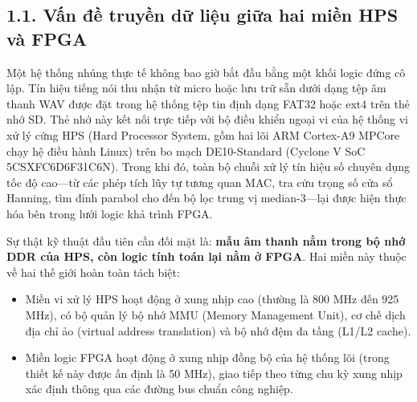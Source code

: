 \subsection*{1.1. Vấn đề truyền dữ liệu giữa hai miền HPS và FPGA}

Một hệ thống nhúng thực tế không bao giờ bắt đầu bằng một khối logic đứng cô lập. Tín hiệu tiếng nói thu nhận từ micro hoặc lưu trữ sẵn dưới dạng tệp âm thanh WAV được đặt trong hệ thống tệp tin định dạng FAT32 hoặc ext4 trên thẻ nhớ SD. Thẻ nhớ này kết nối trực tiếp với bộ điều khiển ngoại vi của hệ thống vi xử lý cứng HPS (Hard Processor System, gồm hai lõi ARM Cortex-A9 MPCore chạy hệ điều hành Linux) trên bo mạch DE10-Standard (Cyclone V SoC 5CSXFC6D6F31C6N). Trong khi đó, toàn bộ chuỗi xử lý tín hiệu số chuyên dụng tốc độ cao---từ các phép tích lũy tự tương quan MAC, tra cứu trọng số cửa sổ Hanning, tìm đỉnh parabol cho đến bộ lọc trung vị median-3---lại được hiện thực hóa bên trong lưới logic khả trình FPGA.

Sự thật kỹ thuật đầu tiên cần đối mặt là: \textbf{mẫu âm thanh nằm trong bộ nhớ DDR của HPS, còn logic tính toán lại nằm ở FPGA}. Hai miền này thuộc về hai thế giới hoàn toàn tách biệt:
\begin{itemize}[leftmargin=1.5em, itemsep=2pt]
    \item Miền vi xử lý HPS hoạt động ở xung nhịp cao (thường là 800 MHz đến 925 MHz), có bộ quản lý bộ nhớ MMU (Memory Management Unit), cơ chế dịch địa chỉ ảo (virtual address translation) và bộ nhớ đệm đa tầng (L1/L2 cache).
    \item Miền logic FPGA hoạt động ở xung nhịp đồng bộ của hệ thống lõi (trong thiết kế này được ấn định là 50 MHz), giao tiếp theo từng chu kỳ xung nhịp xác định thông qua các đường bus chuẩn công nghiệp.
\end{itemize}

